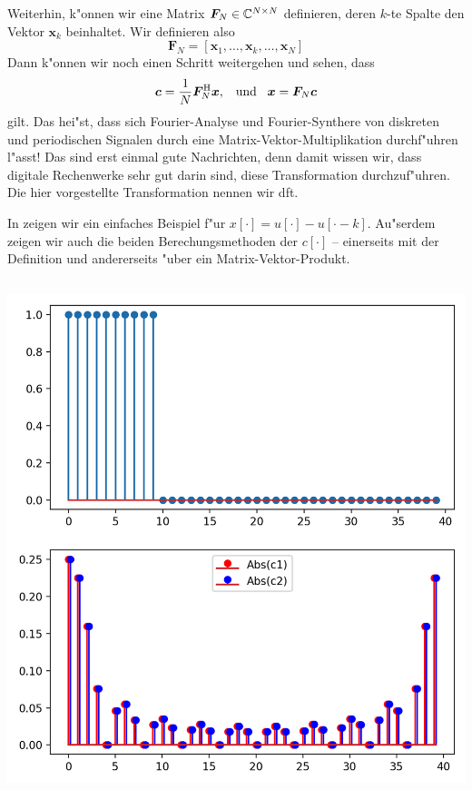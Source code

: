 Weiterhin, k"onnen wir eine Matrix $\bm F_N \in \mathbb{C}^{N \times N}$ definieren, deren $k$-te Spalte den Vektor $\bm x_k$ beinhaltet.
Wir definieren also 
\[
\bm F_N = \left[
    \bm x_1, \ldots, \bm x_k, \ldots, \bm x_N 
\right]
\]
Dann k"onnen wir noch einen Schritt weitergehen und sehen, dass
\[
\bm c = \frac{1}{N} \bm F_N^{\mathrm{H}} \bm x, {\hspace{3mm} \text{und} \hspace{3mm}} \bm x = \bm F_N \bm c
\]
gilt.
Das hei"st, dass sich Fourier-Analyse und Fourier-Synthere von diskreten und periodischen Signalen durch eine Matrix-Vektor-Multiplikation durchf"uhren l"asst!
Das sind erst einmal gute Nachrichten, denn damit wissen wir, dass digitale Rechenwerke sehr gut darin sind, diese Transformation durchzuf"uhren.
Die hier vorgestellte Transformation nennen wir \gls{dft}.

In  zeigen wir ein einfaches Beispiel f"ur $x[\cdot] = u[\cdot] - u[\cdot-k]$.
Au"serdem zeigen wir auch die beiden Berechungsmethoden der $c[\cdot]$ -- einerseits mit der Definition und andererseits "uber ein Matrix-Vektor-Produkt.
%
\begin{listing}[ht]
    \noindent
    \begin{minipage}{0.51\textwidth}
        \strut\vspace*{-\baselineskip}\newline
        \inputminted[firstline=5, lastline=22]{python3}{code/dft_1.py}
    \end{minipage}%
    \begin{minipage}{0.48\textwidth}
        \strut\vspace*{-\baselineskip}\newline
        \includegraphics[width=\textwidth]{code/dft_1.png}
    \end{minipage}
    \label{py:dft_1}
\end{listing}
%
